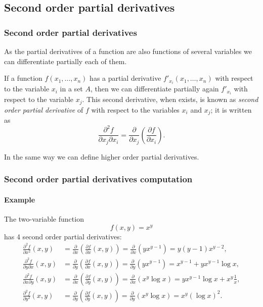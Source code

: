 \subsection{Second order partial derivatives}
\begin{frame}
\frametitle{Second order partial derivatives}
As the partial derivatives of a function are also functions of several variables we can differentiate partially each of them.

If a function $f(x_1,\ldots,x_n)$ has a partial derivative $f'_{x_i}(x_1,\ldots,x_n)$ with respect to the variable $x_i$ in a set $A$, then we can differentiate partially again $f'_{x_i}$ with respect to the variable $x_j$.
This second derivative, when exists, is known as \emph{second order partial derivative} of $f$ with respect to the variables $x_i$ and $x_j$; it is written as
\[
\frac{\partial ^2 f}{\partial x_j \partial x_i}= \frac{\partial}{\partial x_j}\left(\frac{\partial f}{\partial x_i}\right).
\]

In the same way we can define higher order partial derivatives.
\end{frame}


\begin{frame}
\frametitle{Second order partial derivatives computation}
\framesubtitle{Example}
The two-variable function
\[f(x,y)=x^y\]
has 4 second order partial derivatives:
\begin{align*}
\frac{\partial^2 f}{\partial x^2}(x,y) &=
\frac{\partial}{\partial x}\left(\frac{\partial f}{\partial x}(x,y)\right) =
\frac{\partial}{\partial x}\left(yx^{y-1}\right) =
y(y-1)x^{y-2},\\
\frac{\partial^2 f}{\partial y \partial x}(x,y) &=
\frac{\partial}{\partial y}\left(\frac{\partial f}{\partial x}(x,y)\right) =
\frac{\partial}{\partial y}\left(yx^{y-1}\right) =
x^{y-1}+yx^{y-1}\log x,\\
\frac{\partial^2 f}{\partial x \partial y}(x,y) &=
\frac{\partial}{\partial x}\left(\frac{\partial f}{\partial y}(x,y)\right) =
\frac{\partial}{\partial x}\left(x^y\log x \right) =
yx^{y-1}\log x+x^y\frac{1}{x},\\
\frac{\partial^2 f}{\partial y^2}(x,y) &=
\frac{\partial}{\partial y}\left(\frac{\partial f}{\partial y}(x,y)\right) =
\frac{\partial}{\partial y}\left(x^y\log x \right) =
x^y(\log x)^2.
\end{align*}
\end{frame}



